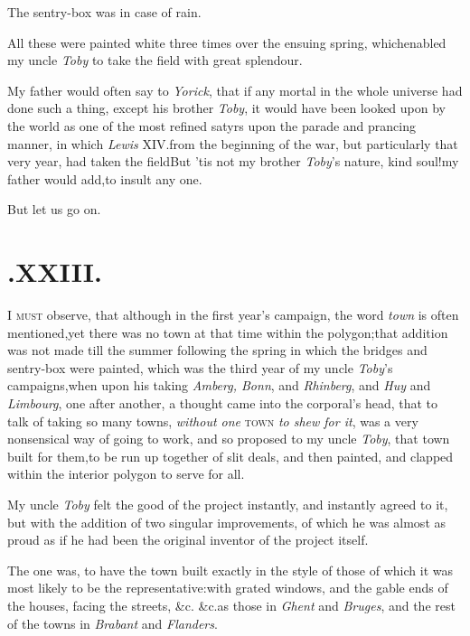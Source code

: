 \documentclass{article}
\begin{document}
\tsh The sentry-box was in case of rain.

All these were painted white three times over the ensuing
spring, which\break enabled my uncle \textit{Toby} to take the field with
great splendour.

My father would often say to \textit{Yorick}, that if any mortal
in the whole universe
had done such a thing, except his bro\-ther \textit{Toby}, it
would have been looked upon by the world as one of the most
refined satyrs upon the parade and prancing manner, in which
\textit{Lewis} XIV.\@ from the beginning of the war, but
particularly that very year, had taken the field\break\tsh But ’tis
not my brother \textit{Toby}’s nature, kind soul!\@ my father
would add,\break to insult any one.

\tsh But let us go on.

\section{.\enspace XXIII.}

\lettrine{I}{ must} observe, that although in the first year’s
campaign, the word \textit{town} is often mentioned,\tsk yet there was no
town at that time within the polygon;\break that addition was not made
till the summer following the spring in which the bridges and
sentry-box were painted, which was the third year of my uncle
\textit{Toby}’s campaigns,\tsk when upon his taking
\textit{Amberg, Bonn}, and \textit{Rhinberg}, and \textit{Huy}
and \textit{Limbourg}, one after another, a thought came into
the corporal’s head, that to talk of taking so many towns,
\textit{without one} \textsc{town} \textit{to shew for it},\tsk
was a very nonsensical way of going to work, and so proposed to
my uncle \textit{Toby}, that 
town built for them,\tsk to be run up together of slit deals,
and then painted, and clapped within the interior polygon to
serve for all.

My uncle \textit{Toby} felt the good of the project instantly, and
instantly agreed to it, but with the addition of two singular
improvements, of which he was almost as proud as if he had been the
original inventor of the project itself.

The one was, to have the town built exactly in the style of
those of which it was most likely to be the
representative:\break\tsh with grated windows, and the gable
ends of the houses, facing the streets, \&c. \&c.\tsk as
those in \textit{Ghent} and \textit{Bruges}, and the rest of the towns
in\break
\textit{Brabant} and \textit{Flanders}.
\end{document}

